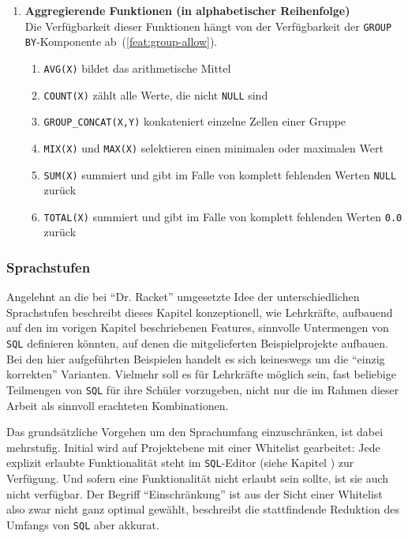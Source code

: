 \begin{enumerate}[resume]
\item \textbf{Aggregierende Funktionen (in alphabetischer Reihenfolge)} \\
  Die Verfügbarkeit dieser Funktionen hängt von der Verfügbarkeit der \texttt{GROUP BY}-Komponente ab~(\ref{feat:group-allow}).
  \begin{enumerate}[noitemsep]
  \item \label{feat:fun-avg} \texttt{AVG(X)} bildet das arithmetische Mittel
  \item \label{feat:fun-count} \texttt{COUNT(X)} zählt alle Werte, die nicht \texttt{NULL} sind
  \item \label{feat:fun-group-concat} \texttt{GROUP\_CONCAT(X,Y)} konkateniert einzelne Zellen einer Gruppe
  \item \label{feat:fun-max-min} \texttt{MIX(X)} und \texttt{MAX(X)} selektieren einen minimalen oder maximalen Wert
  \item \label{feat:fun-sum} \texttt{SUM(X)} summiert und gibt im Falle von komplett fehlenden Werten \texttt{NULL} zurück
  \item \label{feat:fun-total} \texttt{TOTAL(X)} summiert und gibt im Falle von komplett fehlenden Werten \texttt{0.0} zurück
  \end{enumerate}
\end{enumerate}

\subsubsection{Sprachstufen}
\label{sec:sql-subset-ranks}

Angelehnt an die bei "`Dr. Racket"' umgesetzte Idee der unterschiedlichen Sprachstufen \cite{macht-der-abstraktion} beschreibt dieses Kapitel konzeptionell, wie Lehrkräfte, aufbauend auf den im vorigen Kapitel beschriebenen Features, sinnvolle Untermengen von \texttt{SQL} definieren könnten, auf denen die mitgelieferten Beispielprojekte aufbauen. Bei den hier aufgeführten Beispielen handelt es sich keineswegs um die "`einzig korrekten"' Varianten. Vielmehr soll es für Lehrkräfte möglich sein, fast beliebige Teilmengen von \texttt{SQL} für ihre Schüler vorzugeben, nicht nur die im Rahmen dieser Arbeit als sinnvoll erachteten Kombinationen.

Das grundsätzliche Vorgehen um den Sprachumfang einzuschränken, ist dabei mehrstufig. Initial wird auf Projektebene mit einer Whitelist gearbeitet: Jede explizit erlaubte Funktionalität steht im \texttt{SQL}-Editor (siehe Kapitel ) zur Verfügung. Und sofern eine Funktionalität nicht erlaubt sein sollte, ist sie auch nicht verfügbar. Der Begriff "`Einschränkung"' ist aus der Sicht einer Whitelist also zwar nicht ganz optimal gewählt, beschreibt die stattfindende Reduktion des Umfangs von \texttt{SQL} aber akkurat.

